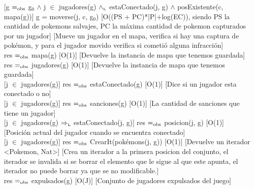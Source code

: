 [g $=_{\mathrm{obs}}$ g$_0$ $\wedge$ j $\in$ jugadores(g) $\land_{\mathrm{\scriptscriptstyle{L}}}$ estaConectado(j, g) $\wedge$ posExistente(c, mapa(g))]
{g = moverse(j, c, g$_0$)}
[O((PS + PC)*|P|+log(EC)), siendo PS la cantidad de pokemons salvajes, PC la máxima cantidad de pokemon capturados por un jugador]
[Mueve un jugador en el mapa, verifica si hay una captura de pokémon, y para el jugador movido verifica si cometió alguna infracción]\\


{res $=_{\mathrm{obs}}$ mapa(g)}
[O(1)]
[Devuelve la instancia de mapa que tenemos guardada]
\\

{res $=_{\mathrm{obs}}$ jugadores(g)}
[O(1)]
[Devuelve la instancia de mapa que tenemos guardada]
\\

[j $\in$ jugadores(g)]
{res $=_{\mathrm{obs}}$ estaConectado(g)}
[O(1)]
[Dice si un jugador esta conectado o no]
\\

[j $\in$ jugadores(g)]
{res $=_{\mathrm{obs}}$ sanciones(g)}
[O(1)]
[La cantidad de sanciones que tiene un jugador]
\\

[j $\in$ jugadores(g) $\Rightarrow_{\mathrm{\scriptscriptstyle{L}}}$ estaConectado(j, g)]
{res $=_{\mathrm{obs}}$ posicion(j, g)}
[O(1)]
[Posici\'on actual del jugador cuando se encuentra conectado]
\\

[j $\in$ jugadores(g)]
{res $=_{\mathrm{obs}}$ CrearIt(pok\'emons(j, g))}
[O(1)]
[Devuelve un iterador <Pokemon, Nat>]
[Crea un iterador a la primera posicion del conjunto, el iterador se invalida si se borrar el elemento que le sigue al que este apunta, el iterador no puede borrar ya que se no modificable.]
\\

{res $=_{\mathrm{obs}}$ expulsados(g)}
[O(J)]
[Conjunto de jugadores expulsados del juego]
\\

